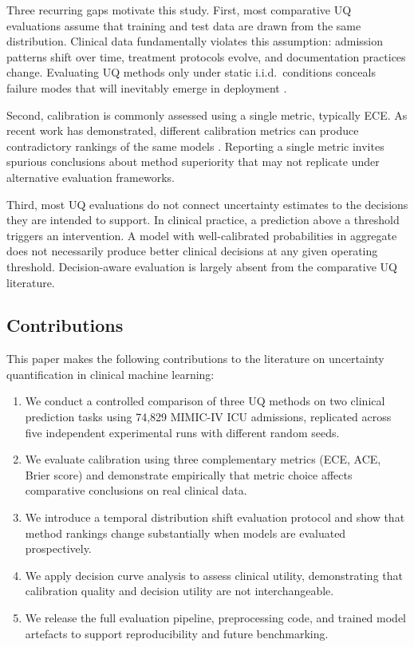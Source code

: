 \documentclass[11pt,a4paper]{article}
\begin{document}
Three recurring gaps motivate this study. First, most comparative UQ evaluations assume that training and test data are drawn from the same distribution. Clinical data fundamentally violates this assumption: admission patterns shift over time, treatment protocols evolve, and documentation practices change. Evaluating UQ methods only under static i.i.d.\ conditions conceals failure modes that will inevitably emerge in deployment \citep{finlayson2021,nestor2019}.

Second, calibration is commonly assessed using a single metric, typically ECE. As recent work has demonstrated, different calibration metrics can produce contradictory rankings of the same models \citep{nixon2019,vaicenavicius2019}. Reporting a single metric invites spurious conclusions about method superiority that may not replicate under alternative evaluation frameworks.

Third, most UQ evaluations do not connect uncertainty estimates to the decisions they are intended to support. In clinical practice, a prediction above a threshold triggers an intervention. A model with well-calibrated probabilities in aggregate does not necessarily produce better clinical decisions at any given operating threshold. Decision-aware evaluation is largely absent from the comparative UQ literature.

\subsection{Contributions}

This paper makes the following contributions to the literature on uncertainty quantification in clinical machine learning:

\begin{enumerate}
  \item We conduct a controlled comparison of three UQ methods on two clinical prediction tasks using 74,829 MIMIC-IV ICU admissions, replicated across five independent experimental runs with different random seeds.
  \item We evaluate calibration using three complementary metrics (ECE, ACE, Brier score) and demonstrate empirically that metric choice affects comparative conclusions on real clinical data.
  \item We introduce a temporal distribution shift evaluation protocol and show that method rankings change substantially when models are evaluated prospectively.
  \item We apply decision curve analysis to assess clinical utility, demonstrating that calibration quality and decision utility are not interchangeable.
  \item We release the full evaluation pipeline, preprocessing code, and trained model artefacts to support reproducibility and future benchmarking.
\end{enumerate}
\end{document}
